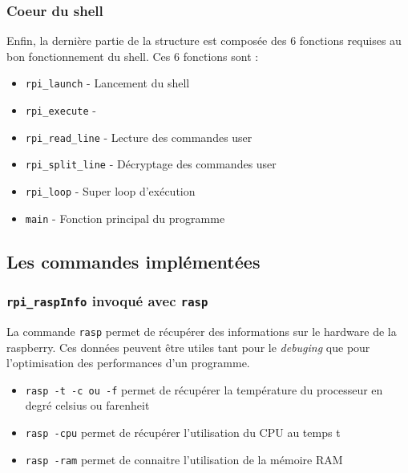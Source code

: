 \documentclass[10pt,a4paper]{article}
\begin{document}
\subsubsection{Coeur du shell}
Enfin, la dernière partie de la structure est composée des 6 fonctions requises au bon fonctionnement du shell. Ces 6 fonctions sont : 
\begin{itemize}
\item \texttt{rpi\_launch} - Lancement du shell\\

\item \texttt{rpi\_execute} - 

\item \texttt{rpi\_read\_line} - Lecture des commandes user\\

\item \texttt{rpi\_split\_line} - Décryptage des commandes user\\

\item \texttt{rpi\_loop} - Super loop d'exécution\\

\item \texttt{main} - Fonction principal du programme\\

\end{itemize}

\subsection{Les commandes implémentées}
\subsubsection{\texttt{rpi\_raspInfo} invoqué avec \texttt{rasp}}
La commande \texttt{rasp} permet de récupérer des informations sur le hardware de la raspberry. Ces données peuvent être utiles tant pour le \textit{debuging} que pour l'optimisation des performances d'un programme. 

\begin{itemize}
\item \texttt{rasp -t -c ou -f} permet de récupérer la température du processeur en degré celsius ou farenheit

\item \texttt{rasp -cpu} permet de récupérer l'utilisation du CPU au temps t

\item \texttt{rasp -ram} permet de connaitre l'utilisation de la mémoire RAM 
\end{itemize}
\end{document}
